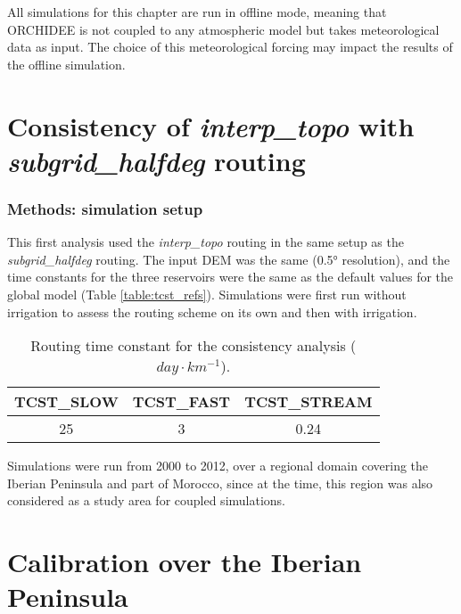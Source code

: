 All simulations for this chapter are run in offline mode, meaning that ORCHIDEE is not coupled to any atmospheric model but takes meteorological data as input. The choice of this meteorological forcing may impact the results of the offline simulation.

\section{Consistency of \textit{interp\_topo} with \textit{subgrid\_halfdeg} routing}
\subsubsection{Methods: simulation setup}

This first analysis used the \textit{interp\_topo} routing in the same setup as the \textit{subgrid\_halfdeg} routing. 
The input DEM was the same (0.5° resolution), and the time constants for the three reservoirs were the same as the default values for the global model (Table \ref{table:tcst_refs}). Simulations were first run without irrigation to assess the routing scheme on its own and then with irrigation.

\begin{table}[h]
\centering
\begin{tabular}{|c|c|c|}
\hline
\textbf{TCST\_SLOW} & \textbf{TCST\_FAST} & \textbf{TCST\_STREAM} \\ \hline
25            & 3             & 0.24            \\ \hline
\end{tabular}
\caption{Routing time constant for the consistency analysis ($day \cdot km^{-1}$).}
\label{table:tcst_consistency}
\end{table}


Simulations were run from 2000 to 2012, over a regional domain covering the Iberian Peninsula and part of Morocco, since at the time, this region was also considered as a study area for coupled simulations.




\section{Calibration over the Iberian Peninsula}

